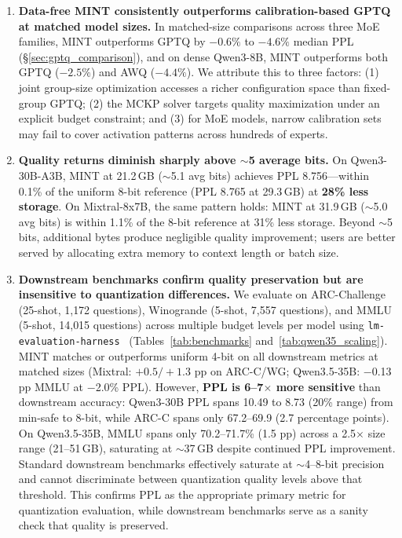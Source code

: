 \documentclass{article}
\begin{document}
\begin{enumerate}
\item \textbf{Data-free MINT consistently outperforms calibration-based GPTQ at matched model sizes.}
In matched-size comparisons across three MoE families, MINT outperforms GPTQ by $-0.6\%$ to $-4.6\%$ median PPL (\S\ref{sec:gptq_comparison}), and on dense Qwen3-8B, MINT outperforms both GPTQ ($-2.5\%$) and AWQ ($-4.4\%$). We attribute this to three factors: (1) joint group-size optimization accesses a richer configuration space than fixed-group GPTQ; (2) the MCKP solver targets quality maximization under an explicit budget constraint; and (3) for MoE models, narrow calibration sets may fail to cover activation patterns across hundreds of experts.

\item \textbf{Quality returns diminish sharply above ${\sim}$5 average bits.}
On Qwen3-30B-A3B, MINT at 21.2\,GB (${\sim}$5.1 avg bits) achieves PPL 8.756---within 0.1\% of the uniform 8-bit reference (PPL 8.765 at 29.3\,GB) at \textbf{28\% less storage}. On Mixtral-8x7B, the same pattern holds: MINT at 31.9\,GB (${\sim}$5.0 avg bits) is within 1.1\% of the 8-bit reference at 31\% less storage. Beyond ${\sim}$5 bits, additional bytes produce negligible quality improvement; users are better served by allocating extra memory to context length or batch size.

\item \textbf{Downstream benchmarks confirm quality preservation but are insensitive to quantization differences.}
We evaluate on ARC-Challenge (25-shot, 1{,}172 questions), Winogrande (5-shot, 7{,}557 questions), and MMLU (5-shot, 14{,}015 questions) across multiple budget levels per model using \texttt{lm-evaluation-harness}~\cite{eval-harness} (Tables~\ref{tab:benchmarks} and~\ref{tab:qwen35_scaling}). MINT matches or outperforms uniform 4-bit on all downstream metrics at matched sizes (Mixtral: $+0.5/+1.3$ pp on ARC-C/WG; Qwen3.5-35B: $-$0.13 pp MMLU at $-$2.0\% PPL). However, \textbf{PPL is 6--7$\times$ more sensitive} than downstream accuracy: Qwen3-30B PPL spans 10.49 to 8.73 (20\% range) from min-safe to 8-bit, while ARC-C spans only 67.2--69.9 (2.7 percentage points). On Qwen3.5-35B, MMLU spans only 70.2--71.7\% (1.5 pp) across a 2.5$\times$ size range (21--51\,GB), saturating at ${\sim}$37\,GB despite continued PPL improvement. Standard downstream benchmarks effectively saturate at ${\sim}$4--8-bit precision and cannot discriminate between quantization quality levels above that threshold. This confirms PPL as the appropriate primary metric for quantization evaluation, while downstream benchmarks serve as a sanity check that quality is preserved.


\end{enumerate}
\end{document}

